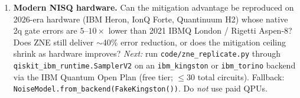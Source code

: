 \begin{enumerate}
  \item \textbf{Modern NISQ hardware.} Can the mitigation advantage be reproduced on 2026-era hardware (IBM Heron, IonQ Forte, Quantinuum H2) whose native 2q gate errors are $5$--$10\times$ lower than 2021 IBMQ London / Rigetti Aspen-8? Does ZNE still deliver $\sim$40\% error reduction, or does the mitigation ceiling shrink as hardware improves? \emph{Next:} run \texttt{code/zne\_replicate.py} through \texttt{qiskit\_ibm\_runtime.SamplerV2} on an \texttt{ibm\_kingston} or \texttt{ibm\_torino} backend via the IBM Quantum Open Plan (free tier; $\le$30 total circuits). Fallback: \texttt{NoiseModel.from\_backend(FakeKingston())}. Do \emph{not} use paid QPUs.
\end{enumerate}
